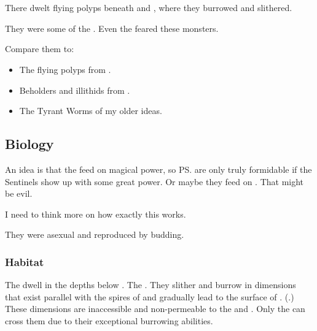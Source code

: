 \section{\Flyingpolyps}
\index{\flyingpolyp}
There dwelt flying polyps beneath \Nyx and \Erebos, where they burrowed and slithered.

They were some of the . 
Even the \banes feared these monsters.

Compare them to:
\begin{itemize}
  \item The flying polyps from \cite{HPLovecraft:TheShadowOutofTime}. 
  \item Beholders and illithids from \cite{RPG:DungeonsandDragons}.
  \item The Tyrant Worms of my older ideas.
\end{itemize}











\subsection{Biology}

An idea is that the \noggyaleth{} feed on magical power, so \ps{\Teshrial} \noggyaleth{} are only truly formidable if the Sentinels show up with some great power. Or maybe they feed on \vertices. That might be evil. 

I need to think more on how exactly this works. 

They were asexual and reproduced by budding.





\subsubsection{Habitat}
The \flyingpolyps dwell in the depths below \Nyx. 
The . 
They slither and burrow in dimensions that exist parallel with the spires of \Nyx and gradually lead to the surface of \Erebos. 
(.)
These dimensions are inaccessible and non-permeable to the \resphain and \banes. 
Only the \flyingpolyps can cross them due to their exceptional burrowing abilities. 

